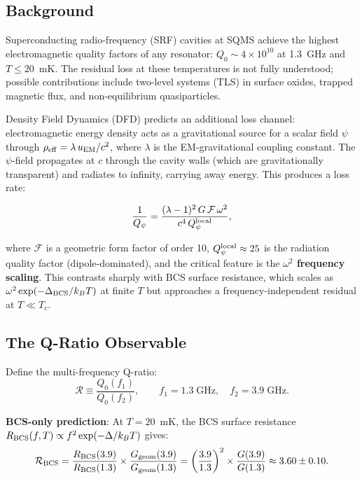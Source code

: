 \documentclass[11pt]{article}
\newcommand{\Qpsi}{Q_\psi}
\theoremstyle{definition}
\theoremstyle{remark}
\begin{document}
\subsection{Background}

Superconducting radio-frequency (SRF) cavities at SQMS achieve
the highest electromagnetic quality factors of any resonator:
$Q_0 \sim 4 \times 10^{10}$ at 1.3~GHz and $T \leq 20$~mK.
The residual loss at these temperatures is not fully understood;
possible contributions include two-level systems (TLS) in surface
oxides, trapped magnetic flux, and non-equilibrium quasiparticles.

Density Field Dynamics (DFD) predicts an additional loss channel:
electromagnetic energy density acts as a gravitational source for
a scalar field $\psi$ through $\rho_{\rm eff} = \lambda\,u_{\rm EM}
/c^2$, where $\lambda$ is the EM-gravitational coupling constant.
The $\psi$-field propagates at $c$ through the cavity walls
(which are gravitationally transparent) and radiates to infinity,
carrying away energy. This produces a loss rate:

\begin{equation}
\frac{1}{Q_\psi} = \frac{(\lambda-1)^2\,G\,\mathcal{F}\,\omega^2}
{c^4\,\Qpsi^{\rm local}},
\label{eq:qpsi_loss}
\end{equation}

where $\mathcal{F}$ is a geometric form factor of order 10,
$\Qpsi^{\rm local} \approx 25$ is the radiation quality factor
(dipole-dominated), and the critical feature is the \textbf{$\omega^2$
frequency scaling}. This contrasts sharply with BCS surface resistance,
which scales as $\omega^2 \exp(-\Delta_{\rm BCS}/k_B T)$ at finite $T$
but approaches a frequency-independent residual at $T \ll T_c$.

\subsection{The Q-Ratio Observable}

Define the multi-frequency Q-ratio:
\begin{equation}
\mathcal{R} \equiv \frac{Q_0(f_1)}{Q_0(f_2)}, \qquad
f_1 = 1.3\;\text{GHz}, \quad f_2 = 3.9\;\text{GHz}.
\end{equation}

\textbf{BCS-only prediction}: At $T = 20$~mK, the BCS surface
resistance $R_{\rm BCS}(f, T) \propto f^2\exp(-\Delta/k_BT)$ gives:
\begin{equation}
\mathcal{R}_{\rm BCS} = \frac{R_{\rm BCS}(3.9)}{R_{\rm BCS}(1.3)}
\times \frac{G_{\rm geom}(3.9)}{G_{\rm geom}(1.3)}
= \left(\frac{3.9}{1.3}\right)^2 \times \frac{G(3.9)}{G(1.3)}
\approx 3.60 \pm 0.10.
\end{equation}
\end{document}
